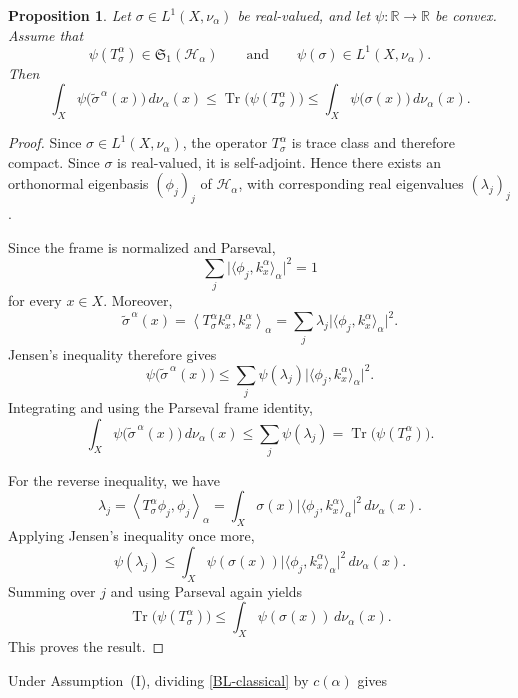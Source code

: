 \documentclass{amsart}
\newtheorem{prop}[thm]{Proposition}
\theoremstyle{definition}
\theoremstyle{remark}
\numberwithin{equation}{section}
\begin{document}
\begin{prop}\label{BL1}
Let $\sigma\in L^1(X,\nu_\alpha)$ be real-valued,
and let $\psi:\mathbb{R}\to\mathbb{R}$ be convex. Assume that
\[
\psi(T_\sigma^\alpha)\in\mathfrak{S}_1(\mathcal H_\alpha)
\qquad\text{and}\qquad
\psi(\sigma)\in L^1(X,\nu_\alpha).
\]
Then
\begin{equation}\label{BL-classical}
\int_X
\psi\bigl(\widetilde{\sigma}^{\,\alpha}(x)\bigr)
\,d\nu_\alpha(x)
\leq
\operatorname{Tr}\bigl(\psi(T_\sigma^\alpha)\bigr)
\leq
\int_X\psi\bigl(\sigma(x)\bigr)\,d\nu_\alpha(x).
\end{equation}
\end{prop}


\begin{proof} Since $\sigma\in L^1(X,\nu_\alpha)$, the operator
$T_\sigma^\alpha$ is trace class and therefore compact. Since
$\sigma$ is real-valued, it is self-adjoint. Hence there exists an
orthonormal eigenbasis $(\phi_j)_j$ of $\mathcal H_\alpha$, with
corresponding real eigenvalues $(\lambda_j)_j$.

Since the frame is normalized and Parseval,
\[
\sum_j
\bigl|\langle \phi_j,k_x^\alpha\rangle_\alpha\bigr|^2=1
\]
for every $x\in X$. Moreover,
\[
\widetilde{\sigma}^{\,\alpha}(x)
=
\left\langle T_\sigma^\alpha k_x^\alpha,k_x^\alpha
\right\rangle_\alpha
=
\sum_j \lambda_j
\bigl|\langle \phi_j,k_x^\alpha\rangle_\alpha\bigr|^2.
\]
Jensen's inequality therefore gives
\[
\psi\bigl(\widetilde{\sigma}^{\,\alpha}(x)\bigr)
\leq
\sum_j \psi(\lambda_j)
\bigl|\langle \phi_j,k_x^\alpha\rangle_\alpha\bigr|^2.
\]
Integrating and using the Parseval frame identity,
\[
\int_X
\psi\bigl(\widetilde{\sigma}^{\,\alpha}(x)\bigr)
\,d\nu_\alpha(x)
\leq
\sum_j\psi(\lambda_j)
=
\operatorname{Tr}\bigl(\psi(T_\sigma^\alpha)\bigr).
\]

For the reverse inequality, we have
\[
\lambda_j
=
\left\langle T_\sigma^\alpha\phi_j,\phi_j\right\rangle_\alpha
=
\int_X \sigma(x)
\bigl|\langle \phi_j,k_x^\alpha\rangle_\alpha\bigr|^2
\,d\nu_\alpha(x).
\]
Applying Jensen's inequality once more,
\[
\psi(\lambda_j)
\leq
\int_X \psi(\sigma(x))
\bigl|\langle \phi_j,k_x^\alpha\rangle_\alpha\bigr|^2
\,d\nu_\alpha(x).
\]
Summing over $j$ and using Parseval again yields
\[
\operatorname{Tr}\bigl(\psi(T_\sigma^\alpha)\bigr)
\leq
\int_X \psi(\sigma(x))\,d\nu_\alpha(x).
\]
This proves the result.
\end{proof}


Under Assumption~(I), dividing \eqref{BL-classical} by $c(\alpha)$ gives
\end{document}
